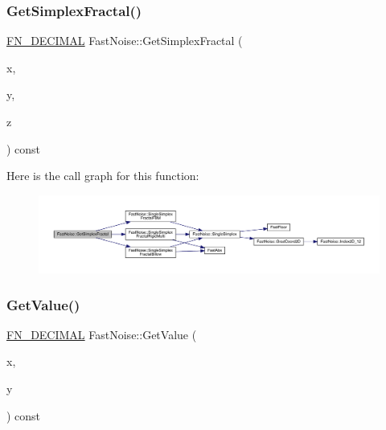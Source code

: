 \subsubsection{\texorpdfstring{Get\+Simplex\+Fractal()}{GetSimplexFractal()}\hspace{0.1cm}{\footnotesize\ttfamily [2/2]}}
{\footnotesize\ttfamily \mbox{\hyperlink{_fast_noise_8h_a75a9ef6d2541c4921815b885bfd449c3}{F\+N\+\_\+\+D\+E\+C\+I\+M\+AL}} Fast\+Noise\+::\+Get\+Simplex\+Fractal (\begin{DoxyParamCaption}\item[{\mbox{\hyperlink{_fast_noise_8h_a75a9ef6d2541c4921815b885bfd449c3}{F\+N\+\_\+\+D\+E\+C\+I\+M\+AL}}}]{x,  }\item[{\mbox{\hyperlink{_fast_noise_8h_a75a9ef6d2541c4921815b885bfd449c3}{F\+N\+\_\+\+D\+E\+C\+I\+M\+AL}}}]{y,  }\item[{\mbox{\hyperlink{_fast_noise_8h_a75a9ef6d2541c4921815b885bfd449c3}{F\+N\+\_\+\+D\+E\+C\+I\+M\+AL}}}]{z }\end{DoxyParamCaption}) const}

Here is the call graph for this function\+:
\nopagebreak
\begin{figure}[H]
\begin{center}
\leavevmode
\includegraphics[width=350pt]{d1/dd8/class_fast_noise_a56b14e348cf0762010e6c58b6f5243f9_cgraph}
\end{center}
\end{figure}
\mbox{\label{class_fast_noise_a14145aaff0f8502eb5fd0f168562c69c}} 
\subsubsection{\texorpdfstring{Get\+Value()}{GetValue()}\hspace{0.1cm}{\footnotesize\ttfamily [1/2]}}
{\footnotesize\ttfamily \mbox{\hyperlink{_fast_noise_8h_a75a9ef6d2541c4921815b885bfd449c3}{F\+N\+\_\+\+D\+E\+C\+I\+M\+AL}} Fast\+Noise\+::\+Get\+Value (\begin{DoxyParamCaption}\item[{\mbox{\hyperlink{_fast_noise_8h_a75a9ef6d2541c4921815b885bfd449c3}{F\+N\+\_\+\+D\+E\+C\+I\+M\+AL}}}]{x,  }\item[{\mbox{\hyperlink{_fast_noise_8h_a75a9ef6d2541c4921815b885bfd449c3}{F\+N\+\_\+\+D\+E\+C\+I\+M\+AL}}}]{y }\end{DoxyParamCaption}) const}

